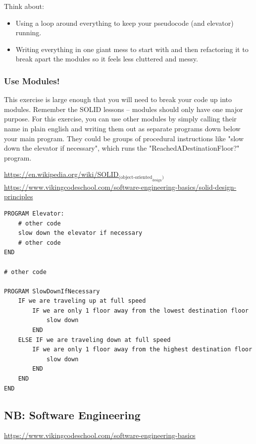 \documentclass[11pt]{article}
\begin{document}
Think about:

\begin{itemize}
\item Using a loop around everything to keep your pseudocode (and elevator) 
running.
\item Writing everything in one giant mess to start with and then refactoring it
to break apart the modules so it feels less cluttered and messy.
\end{itemize}

\subsubsection{Use Modules!}
\label{sec-2-1-3}

This exercise is large enough that you will need to break your code up into
modules. Remember the SOLID lessons -- modules should only have one major 
purpose. For this exercise, you can use other modules by simply calling 
their name in plain english and writing them out as separate programs down
below your main program. They could be groups of procedural instructions 
like "slow down the elevator if necessary", which runs the 
"ReachedADestinationFloor?" program.

\url{https://en.wikipedia.org/wiki/SOLID}$_{\text{(object-oriented}_{\text{design}}\text{)}}$
\url{https://www.vikingcodeschool.com/software-engineering-basics/solid-design-principles}

\begin{verbatim}
PROGRAM Elevator:
    # other code
    slow down the elevator if necessary
    # other code
END

# other code

PROGRAM SlowDownIfNecessary
    IF we are traveling up at full speed
        IF we are only 1 floor away from the lowest destination floor
            slow down
        END
    ELSE IF we are traveling down at full speed
        IF we are only 1 floor away from the highest destination floor
            slow down
        END
    END
END
\end{verbatim}

\subsection{NB: Software Engineering}
\label{sec-2-2}

\url{https://www.vikingcodeschool.com/software-engineering-basics}
\end{document}
